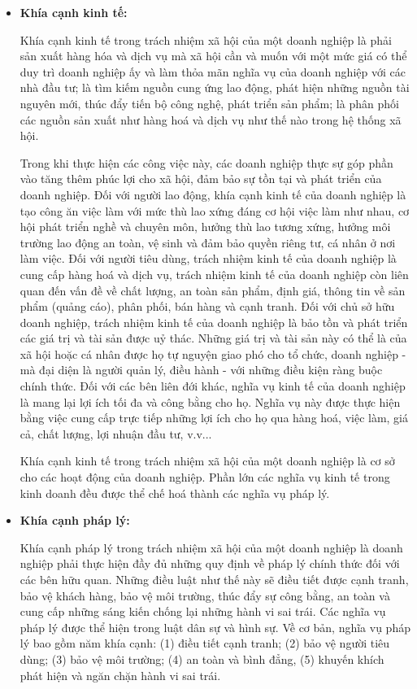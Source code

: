 \documentclass{article}
\begin{document}
        \begin{itemize}
            \item \textbf{Khía cạnh kinh tế:} 
            
            \qquad Khía cạnh kinh tế trong trách nhiệm xã hội của một doanh nghiệp là phải sản xuất hàng hóa và dịch vụ mà xã hội cần và muốn với một mức giá có thể duy trì doanh nghiệp ấy và làm thỏa mãn nghĩa vụ của doanh nghiệp với các nhà đầu tư; là tìm kiếm nguồn cung ứng lao động, phát hiện những nguồn tài nguyên mới, thúc đẩy tiến bộ công nghệ, phát triển sản phẩm; là phân phối các nguồn sản xuất như hàng hoá và dịch vụ như thế nào trong hệ thống xã hội.

            \qquad Trong khi thực hiện các công việc này, các doanh nghiệp thực sự góp phần vào tăng thêm phúc lợi cho xã hội, đảm bảo sự tồn tại và phát triển của doanh nghiệp. Đối với người lao động, khía cạnh kinh tế của doanh nghiệp là tạo công ăn việc làm với mức thù lao xứng đáng cơ hội việc làm như nhau, cơ hội phát triển nghề và chuyên môn, hưởng thù lao tương xứng, hưởng môi trường lao động an toàn, vệ sinh và đảm bảo quyền riêng tư, cá nhân ở nơi làm việc. Đối với người tiêu dùng, trách nhiệm kinh tế của doanh nghiệp là cung cấp hàng hoá và dịch vụ, trách nhiệm kinh tế của doanh nghiệp còn liên quan đến vấn đề về chất lượng, an toàn sản phẩm, định giá, thông tin về sản phẩm (quảng cáo), phân phối, bán hàng và cạnh tranh. Đối với chủ sở hữu doanh nghiệp, trách nhiệm kinh tế của doanh nghiệp là bảo tồn và phát triển các giá trị và tài sản được uỷ thác. Những giá trị và tài sản này có thể là của xã hội hoặc cá nhân được họ tự nguyện giao phó cho tổ chức, doanh nghiệp - mà đại diện là người quản lý, điều hành - với những điều kiện ràng buộc chính thức. Đối với các bên liên đới khác, nghĩa vụ kinh tế của doanh nghiệp là mang lại lợi ích tối đa và công bằng cho họ. Nghĩa vụ này được thực hiện bằng việc cung cấp trực tiếp những lợi ích cho họ qua hàng hoá, việc làm, giá cả, chất lượng, lợi nhuận đầu tư, v.v...

            \qquad Khía cạnh kinh tế trong trách nhiệm xã hội của một doanh nghiệp là cơ sở cho các hoạt động của doanh nghiệp. Phần lớn các nghĩa vụ kinh tế trong kinh doanh đều được thể chế hoá thành các nghĩa vụ pháp lý.

            \item \textbf{Khía cạnh pháp lý:}
            
            \qquad Khía cạnh pháp lý trong trách nhiệm xã hội của một doanh nghiệp là doanh nghiệp phải thực hiện đầy đủ những quy định về pháp lý chính thức đối với các bên hữu quan. Những điều luật như thế này sẽ điều tiết được cạnh tranh, bảo vệ khách hàng, bảo vệ môi trường, thúc đẩy sự công bằng, an toàn và cung cấp những sáng kiến chống lại những hành vi sai trái. Các nghĩa vụ pháp lý được thể hiện trong luật dân sự và hình sự. Về cơ bản, nghĩa vụ pháp lý bao gồm năm khía cạnh: (1) điều tiết cạnh tranh; (2) bảo vệ người tiêu dùng; (3) bảo vệ môi trường; (4) an toàn và bình đẳng, (5) khuyến khích phát hiện và ngăn chặn hành vi sai trái.


\end{itemize}
\end{document}
